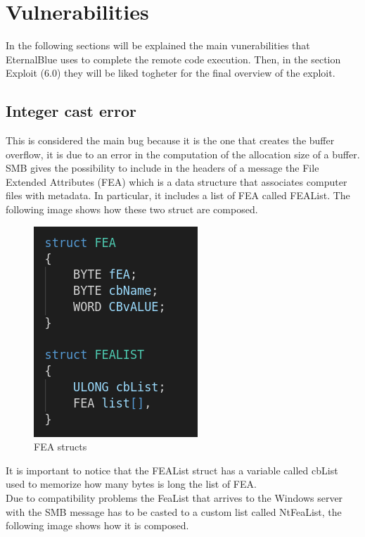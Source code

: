 \section{Vulnerabilities}
In the following sections will be explained the main vunerabilities that EternalBlue uses to complete the remote code execution. 
Then, in the section Exploit (6.0) they will be liked togheter for the final overview of the exploit.

\subsection{Integer cast error}
This is considered the main bug because it is the one that creates the buffer overflow, it is due to an error in the computation of the allocation size of a buffer.\\
SMB gives the possibility to include in the headers of a message the File Extended Attributes (FEA) which is a data structure that 
associates computer files with metadata. In particular, it includes a list of FEA called FEAList.
The following image shows how these two struct are composed.

\begin{figure}[ht!]
  \centering
    \includegraphics[scale=0.5]{images/FEA_code.png}
    \caption{FEA structs}
\end{figure}
\noindent It is important to notice that the FEAList struct has a variable called cbList used to memorize how many bytes is long the list of FEA.\\
Due to compatibility problems the FeaList that arrives to the Windows server with the SMB message has to be casted to 
a custom list called NtFeaList, the following image shows how it is composed.

